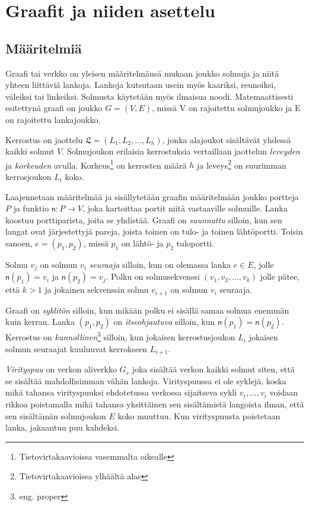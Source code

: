 \documentclass[finnish,12pt]{article}
\begin{document}
	\clearpage
		
	\section{Graafit ja niiden asettelu}

	\subsection{Määritelmiä}

Graafi tai verkko on yleisen määritelmänsä mukaan joukko solmuja ja niitä yhteen liittäviä lankoja.
Lankoja kutsutaan usein myös kaariksi, reunoiksi, väleiksi tai linkeiksi. Solmusta käytetään myös ilmaisua noodi.
Matemaattisesti esitettynä graafi on joukko $G = (V, E)$, missä V on rajoitettu solmujoukko ja E on rajoitettu lankajoukko.

Kerrostus on jaottelu $\mathfrak{L} = (L_1, L_2, \dots, L_h)$, jonka alajoukot sisältävät yhdessä kaikki solmut $V$.
Solmujoukon erilaisia kerrostuksia vertaillaan jaottelun \emph{leveyden} ja \emph{korkeuden} avulla.
Korkeus\footnote{Tietovirtakaavioissa vasemmalta oikealle} on kerrosten määrä $h$ ja leveys\footnote{Tietovirtakaavioissa ylhäältä alas} on suurimman kerrosjoukon $L_i$ koko.

Laajennetaan määritelmää ja sisällytetään graafin määritelmään joukko portteja $P$ ja funktio $\mathsf{n} : P \rightarrow V$, joka kartoittaa portit niitä vastaaville solmuille.
Lanka koostuu porttiparista, joita se yhdistää. Graafi on \emph{suunnattu} silloin, kun sen langat ovat järjestettyjä pareja, joista toinen on tulo- ja toinen lähtöportti.
Toisin sanoen, $e = (p_1, p_2)$, missä $p_1$ on lähtö- ja $p_2$ tuloportti.

Solmu $v_j$ on solmun $v_i$ \emph{seuraaja} silloin, kun on olemassa lanka $e \in E$, jolle $\mathsf{n}(p_1) = v_i$ ja $\mathsf{n}(p_2) = v_j$.
Polku on solmusekvenssi $(v_1, v_2, \dots , v_k)$ jolle pätee, että $k>1$ ja jokainen sekvenssin solmu $v_{i+1}$ on solmun $v_i$ seuraaja.

Graafi on \emph{syklitön} silloin, kun mikään polku ei sisällä samaa solmua enemmän kuin kerran.
Lanka $(p_1, p_2)$ on \emph{itseohjautuva} silloin, kun $\mathsf{n}(p_1) = \mathsf{n}(p_2)$.
Kerrostus on \emph{kunnollinen}\footnote{eng. proper} silloin, kun jokaisen kerrostusjoukon $L_i$ jokaisen solmun seuraajat kuuluuvat kerrokseen $L_{i+1}$.

\emph{Virityspuu} on verkon aliverkko $G_s$ joka sisältää verkon kaikki solmut siten, että se sisältää mahdollisimman vähän lankoja.
Virityspuussa ei ole syklejä, koska mikä tahansa virityspuuksi ehdotetussa verkossa sijaitseva sykli $v_i, ... , v_i$ voidaan rikkoa poistamalla mikä tahansa yksittäinen sen sisältämistä langoista ilman, että sen sisältämän solmujoukon $E$ koko muuttuu.
Kun virityspuusta poistetaan lanka, jakaantuu puu kahdeksi.
\end{document}
